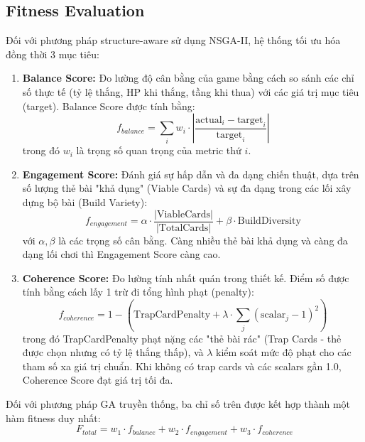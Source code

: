 \subsection{Fitness Evaluation}
Đối với phương pháp structure-aware sử dụng NSGA-II, hệ thống tối ưu hóa đồng thời 3 mục tiêu:
\begin{enumerate}
    \item \textbf{Balance Score:} Đo lường độ cân bằng của game bằng cách so sánh các chỉ số thực tế (tỷ lệ thắng, HP khi thắng, tầng khi thua) với các giá trị mục tiêu (target). Balance Score được tính bằng:
    \begin{equation}
    f_{balance} = \sum_{i} w_i \cdot \left| \frac{\text{actual}_i - \text{target}_i}{\text{target}_i} \right|
    \end{equation}
    trong đó $w_i$ là trọng số quan trọng của metric thứ $i$.
    
    \item \textbf{Engagement Score:} Đánh giá sự hấp dẫn và đa dạng chiến thuật, dựa trên số lượng thẻ bài "khả dụng" (Viable Cards) và sự đa dạng trong các lối xây dựng bộ bài (Build Variety):
    \begin{equation}
    f_{engagement} = \alpha \cdot \frac{|\text{ViableCards}|}{|\text{TotalCards}|} + \beta \cdot \text{BuildDiversity}
    \end{equation}
    với $\alpha, \beta$ là các trọng số cân bằng. Càng nhiều thẻ bài khả dụng và càng đa dạng lối chơi thì Engagement Score càng cao.
    
    \item \textbf{Coherence Score:} Đo lường tính nhất quán trong thiết kế. Điểm số được tính bằng cách lấy 1 trừ đi tổng hình phạt (penalty):
    \begin{equation}
    f_{coherence} = 1 - \left( \text{TrapCardPenalty} + \lambda \cdot \sum_{j} (\text{scalar}_j - 1)^2 \right)
    \end{equation}
    trong đó TrapCardPenalty phạt nặng các "thẻ bài rác" (Trap Cards - thẻ được chọn nhưng có tỷ lệ thắng thấp), và $\lambda$ kiểm soát mức độ phạt cho các tham số xa giá trị chuẩn. Khi không có trap cards và các scalars gần 1.0, Coherence Score đạt giá trị tối đa.
\end{enumerate}
Đối với phương pháp GA truyền thống, ba chỉ số trên được kết hợp thành một hàm fitness duy nhất:
\begin{equation}
F_{total} = w_1 \cdot f_{balance} + w_2 \cdot f_{engagement} + w_3 \cdot f_{coherence}
\end{equation}